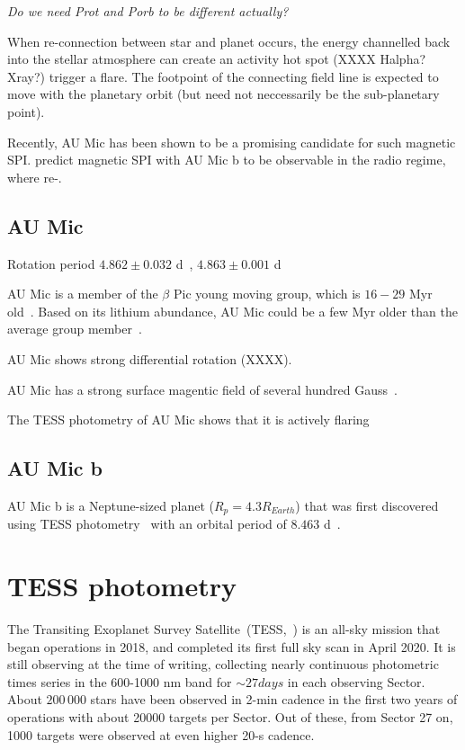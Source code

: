 \documentclass[fleqn,usenatbib,letters]{mnras}%
\begin{document}
\textit{Do we need Prot and Porb to be different actually?}

When re-connection between star and planet occurs, the energy channelled back into the stellar atmosphere can create an activity hot spot (XXXX Halpha? Xray?) trigger a flare. The footpoint of the connecting field line is expected to move with the planetary orbit (but need not neccessarily be the sub-planetary point).

Recently, AU Mic has been shown to be a promising candidate for such magnetic SPI. \citet{kavanagh2021} predict magnetic SPI with AU Mic b to be observable in the radio regime, where re-.  



\subsection{AU Mic}
Rotation period $4.862\pm 0.032$ d~\citep{martioli2021}, $4.863\pm 0.001$ d~\citep{plavchan2020}

AU Mic is a member of the $\beta$ Pic young moving group, which is $16-29$ Myr old~\citep{malo2014,binks2014,mamajek2014,bell2015,binks2016,shkolnik2017,miretroig2020}. Based on its lithium abundance, AU Mic could be a few Myr older than the average group member~\citep{malo2014}. 

AU Mic shows strong differential rotation (XXXX).

AU Mic has a strong surface magentic field of several hundred Gauss~\citep{klein2021}.

The TESS photometry of AU Mic shows that it is actively flaring~\citep{martioli2021}
\subsection{AU Mic b}
AU Mic b is a Neptune-sized planet ($R_p = 4.3R_{Earth}$) that was first discovered using TESS photometry~\citep{plavchan2020} with an orbital period of $8.463$ d~\citep{plavchan2020,martioli2021}.

\section{TESS photometry}
The Transiting Exoplanet Survey Satellite~(TESS,~\citealt{ricker2014}) is an all-sky mission that began operations in 2018, and completed its first full sky scan in April 2020. It is still observing at the time of writing, collecting nearly continuous photometric times series in the 600-1000 nm band for $\sim 27 days$ in each observing Sector. About $200\,000$ stars have been observed in 2-min cadence in the first two years of operations with about 20000 targets per Sector. Out of these, from Sector 27 on, 1000 targets were observed at even higher 20-s cadence.
\end{document}
